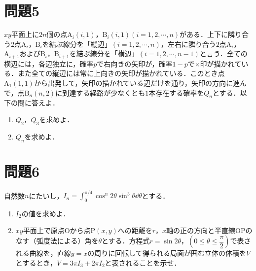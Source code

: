 \documentclass[unicode,12pt, A4j]{ltjsarticle}%
\begin{document}
\section{問題5}
$xy$平面上に$2n$個の点$\mathrm{A}_i(i,1)$，$\mathrm{B}_i(i,1) (i=1,2,\cdots,n)$がある．上下に隣り合う$2$点$\mathrm{A}_i$，$\mathrm{B}_i$を結ぶ線分を「縦辺」$(i=1,2,\cdots,n)$，左右に隣り合う$2$点$\mathrm{A}_i$，$\mathrm{A}_{i+1}$および$\mathrm{B}_i$，$\mathrm{B}_{i+1}$を結ぶ線分を「横辺」$(i=1,2,\cdots,n-1)$と言う．全ての横辺には，各辺独立に，確率$p$で右向きの矢印が，確率$1-p$で$\times$印が描かれている．また全ての縦辺には常に上向きの矢印が描かれている．このとき点$\mathrm{A}_1(1,1)$から出発して，矢印の描かれている辺だけを通り，矢印の方向に進んで，点$\mathrm{B}_{n}(n,2)$に到達する経路が少なくとも$1$本存在する確率を$Q_n$とする．以下の問に答えよ．
\begin{enumerate}
 \item $Q_2$，$Q_3$を求めよ．
 \item $Q_n$を求めよ．
\end{enumerate}


\section{問題6}
自然数$n$にたいし，${\displaystyle I_n=\int_{0}^{\pi/4}\cos^n 2\theta \sin^3\theta \dd\theta}$とする．
\begin{enumerate}
 \item $I_2$の値を求めよ．
 \item $xy$平面上で原点$\mathrm{O}$から点$\mathrm{P}(x,y)$への距離を$r$，$x$軸の正の方向と半直線$\mathrm{OP}$のなす（弧度法による）角を$\theta$とする．方程式$r=\sin 2\theta$，$\left(0\le\theta\le\dfrac{\pi}{2}\right)$で表される曲線を，直線$y=x$の周りに回転して得られる局面が囲む立体の体積を$V$とするとき，$V=3\pi I_3+2\pi I_2$と表されることを示せ．
\end{enumerate}
\end{document}
